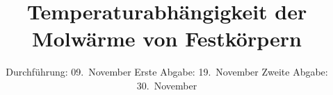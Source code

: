 

\subject{Fortgeschrittenen Praktikum WS 15/16 - V47}
\title{Temperaturabhängigkeit der Molwärme von
Festkörpern}

\date{
	Durchführung: 09.~November 
	Erste Abgabe: 19.~November
	Zweite Abgabe: 30.~November
}



\maketitle
\thispagestyle{empty}
\tableofcontents
\newpage






\printbibliography


